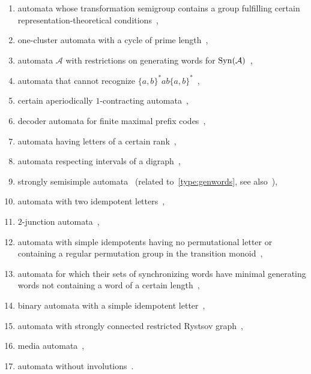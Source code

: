 \begin{enumerate}
	\item automata whose transformation semigroup contains a group fulfilling certain representation-theoretical conditions~\cite{Steinberg10},
		
	\item one-cluster automata with a cycle of prime length~\cite{Steinberg11a},
	
	\item \label{type:genwords} automata $\mathcal A$ with restrictions on generating words for $\operatorname{Syn}(\mathcal A)$~\cite{DBLP:journals/jalc/FrigeriR19,DBLP:journals/iandc/PribavkinaR11},
		
	\item automata that cannot recognize $\{a,b\}^*ab\{a,b\}^*$~\cite{AlmeidaS09},
	
	\item certain aperiodically $1$-contracting automata~\cite{Don16}, 
	
	\item decoder automata for finite maximal prefix codes~\cite{BerlinkovS16},
	
	\item automata having letters of a certain rank~\cite{BerlinkovS16},
	
	\item automata respecting intervals of a digraph~\cite{DBLP:journals/dmtcs/GrechK13a},	

	\item strongly semisimple automata~\cite{DBLP:journals/ijfcs/AlmeidaR16} (related to~\cref{type:genwords}, see also~\cite{Rodaro2019}),
	
	\item automata with two idempotent letters~\cite[Prop.~5]{DBLP:journals/jalc/Volkov19a},
	
	\item $2$-junction automata~\cite{DBLP:journals/dam/GrechK20a},
	
	\item automata with simple idempotents having no permutational letter
	or containing a regular permutation group in the transition monoid~\cite{Rystsov2022},
	
	\item automata for which their sets of synchronizing words have minimal generating words not containing a word of a certain length~\cite{DBLP:journals/jalc/FrigeriR19}, 
		
	\item binary automata with a simple idempotent letter~\cite{volkov2025listresultsvcernyconjecture}, 
	
	\item automata with strongly connected restricted Rystsov graph~\cite{CasasVolkov2024Don,volkov2025listresultsvcernyconjecture},
	
	\item media automata~\cite{Eppstein2007Algorithms},
	
	\item automata without involutions~\cite{Trahtman2008}.
\end{enumerate}


